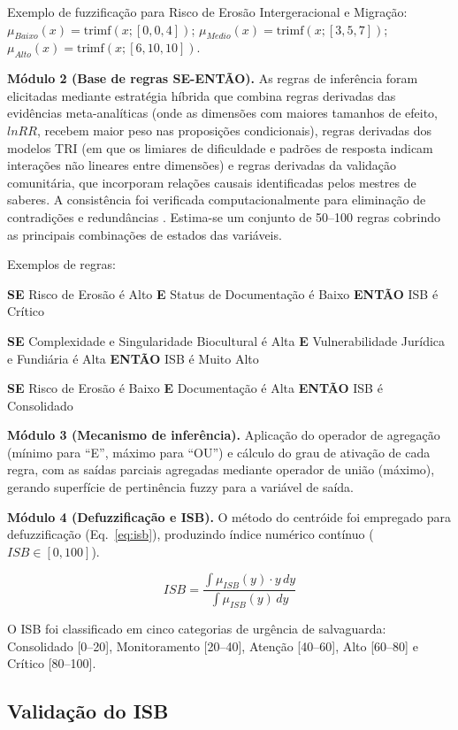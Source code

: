 \documentclass[pdflatex,sn-basic]{sn-jnl}%
\theoremstyle{thmstyleone}%
\theoremstyle{thmstyletwo}%
\theoremstyle{thmstylethree}%
\begin{document}
Exemplo de fuzzificação para Risco de Erosão Intergeracional e Migração: $\mu_{Baixo}(x) = \text{trimf}(x; [0, 0, 4])$; $\mu_{Medio}(x) = \text{trimf}(x; [3, 5, 7])$; $\mu_{Alto}(x) = \text{trimf}(x; [6, 10, 10])$.

\textbf{Módulo 2 (Base de regras SE-ENTÃO).} As regras de inferência foram elicitadas mediante estratégia híbrida que combina regras derivadas das evidências meta-analíticas (onde as dimensões com maiores tamanhos de efeito, $lnRR$, recebem maior peso nas proposições condicionais), regras derivadas dos modelos TRI (em que os limiares de dificuldade e padrões de resposta indicam interações não lineares entre dimensões) e regras derivadas da validação comunitária, que incorporam relações causais identificadas pelos mestres de saberes. A consistência foi verificada computacionalmente para eliminação de contradições e redundâncias \citep{Zadeh1965}. Estima-se um conjunto de 50--100 regras cobrindo as principais combinações de estados das variáveis.

Exemplos de regras:

\textbf{SE} Risco de Erosão é Alto \textbf{E} Status de Documentação é Baixo \textbf{ENTÃO} ISB é Crítico

\textbf{SE} Complexidade e Singularidade Biocultural é Alta \textbf{E} Vulnerabilidade Jurídica e Fundiária é Alta \textbf{ENTÃO} ISB é Muito Alto

\textbf{SE} Risco de Erosão é Baixo \textbf{E} Documentação é Alta \textbf{ENTÃO} ISB é Consolidado

\textbf{Módulo 3 (Mecanismo de inferência).} Aplicação do operador de agregação (mínimo para ``E'', máximo para ``OU'') e cálculo do grau de ativação de cada regra, com as saídas parciais agregadas mediante operador de união (máximo), gerando superfície de pertinência fuzzy para a variável de saída.

\textbf{Módulo 4 (Defuzzificação e ISB).} O método do centróide foi empregado para defuzzificação (Eq.~\ref{eq:isb}), produzindo índice numérico contínuo ($ISB \in [0, 100]$).

\begin{equation}
ISB = \frac{\int \mu_{ISB}(y) \cdot y \, dy}{\int \mu_{ISB}(y) \, dy}
\label{eq:isb}
\end{equation}

O ISB foi classificado em cinco categorias de urgência de salvaguarda: Consolidado [0--20], Monitoramento [20--40], Atenção [40--60], Alto [60--80] e Crítico [80--100].


\subsection{Validação do ISB}\label{subsec:validacao}
\end{document}
